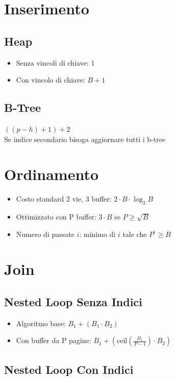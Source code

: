 \documentclass[a4paper, 11pt]{article}
\begin{document}
\section{Inserimento}

\subsection{Heap}
\begin{itemize}
    \item Senza vincoli di chiave: 1
    \item Con vincolo di chiave: $B+1$
\end{itemize}

\subsection{B-Tree}
$((p-h)+1)+2$\\
Se indice secondario bisoga aggiornare tutti i b-tree


\section{Ordinamento}

\begin{itemize}
    \item Costo standard 2 vie, 3 buffer: $2\cdot B\cdot \log_2{B}$
    \item Ottimizzato con P buffer: $3\cdot B$ se $P\ge \sqrt{B}$
    \item Numero di passate $i$: minimo di $i$ tale che $P^i \ge B$
\end{itemize}


\section{Join}
\subsection{Nested Loop Senza Indici}
\begin{itemize}
    \item Algoritmo base: $B_1+(B_1\cdot B_2)$
    \item Con buffer da P pagine: $B_1+(\text{ceil}(\frac{B_1}{P-1})\cdot B_2)$
\end{itemize}

\subsection{Nested Loop Con Indici}
\end{document}
